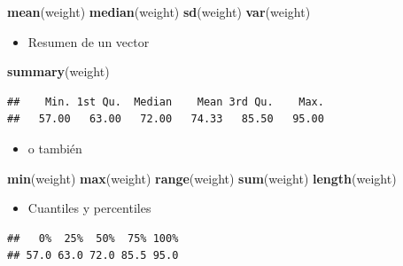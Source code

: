 \documentclass[]{book}
\newenvironment{Shaded}{\begin{snugshade}}{\end{snugshade}}
\newcommand{\KeywordTok}[1]{\textcolor[rgb]{0.13,0.29,0.53}{\textbf{#1}}}
\newcommand{\CommentTok}[1]{\textcolor[rgb]{0.56,0.35,0.01}{\textit{#1}}}
\newcommand{\NormalTok}[1]{#1}
\providecommand{\tightlist}{%
  \setlength{\itemsep}{0pt}\setlength{\parskip}{0pt}}
\begin{document}
\begin{Shaded}
\begin{Highlighting}[]
\KeywordTok{mean}\NormalTok{(weight) }
\KeywordTok{median}\NormalTok{(weight)}
\KeywordTok{sd}\NormalTok{(weight)}
\KeywordTok{var}\NormalTok{(weight)}
\end{Highlighting}
\end{Shaded}

\begin{itemize}
\tightlist
\item
  Resumen de un vector
\end{itemize}

\begin{Shaded}
\begin{Highlighting}[]
\KeywordTok{summary}\NormalTok{(weight)}
\end{Highlighting}
\end{Shaded}

\begin{verbatim}
##    Min. 1st Qu.  Median    Mean 3rd Qu.    Max. 
##   57.00   63.00   72.00   74.33   85.50   95.00
\end{verbatim}

\begin{itemize}
\tightlist
\item
  o también
\end{itemize}

\begin{Shaded}
\begin{Highlighting}[]
\KeywordTok{min}\NormalTok{(weight)}
\KeywordTok{max}\NormalTok{(weight)}
\KeywordTok{range}\NormalTok{(weight)}
\KeywordTok{sum}\NormalTok{(weight)}
\KeywordTok{length}\NormalTok{(weight)}
\end{Highlighting}
\end{Shaded}

\begin{itemize}
\tightlist
\item
  Cuantiles y percentiles
\end{itemize}

\begin{Shaded}
\end{Shaded}

\begin{verbatim}
##   0%  25%  50%  75% 100% 
## 57.0 63.0 72.0 85.5 95.0
\end{verbatim}
\end{document}
